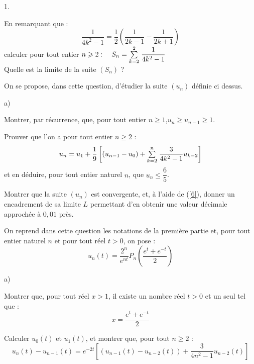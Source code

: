 \documentclass[11pt]{article}%
\begin{document}
\begin{noliste}{1.}
 \setlength{\itemsep}{4mm}
\item En remarquant que :
\[
\dfrac{1}{4k^{2}-1} = \dfrac{1}{2}(\dfrac{1}{2k-1}-\dfrac{1}{2k + 1})
\]
calculer pour tout entier $n\geqslant 2 :\quad S_{n} = {\textstyle\sum\limits_{k =
2}^{2}}\hspace{.1cm}\dfrac{1}{4k^{2}-1}$\\
Quelle est la limite de la suite $(S_{n})$ ?

\item On se propose, dans cette question, d'étudier la suite $(u_{n})$
définie ci dessus.

\begin{noliste}{a)}
 \setlength{\itemsep}{2mm}
\item Montrer, par récurrence, que, pour tout entier $n\geq
1$,\hspace{5mm}$u_{n}\geq u_{n-1}\geq 1$.

\item Prouver que l'on a pour tout entier $n\geq 2$ : 
\begin{equation}
u_{n} = u_{1} + \dfrac{1}{9}\left[ (u_{n-1}-u_{0}) + {\textstyle\sum\limits_{k =
2}^{n}}\hspace{.1cm}\dfrac{3}{4k^{2}-1}u_{k-2}\right] \label{6}
\end{equation}et en déduire, pour tout entier naturel $n$, que
$u_{n}\leq \dfrac{6}{5}
$.

\item Montrer que la suite $(u_{n})$ est convergente, et, à l'aide de
(\ref{6}), donner un encadrement de sa limite $L$ permettant d'en
obtenir une
valeur décimale approchée à $0,01$ près.
\end{noliste}

\item On reprend dans cette question les notations de la première
partie et,
pour tout entier naturel $n$ et pour tout réel $t>0$, on pose : 
\[
u_{n}(t) = \dfrac{2^{n}}{e^{nt}}P_{n}(\dfrac{e^{t} + e^{-t}}{{2}})
\]

\begin{noliste}{a)}
 \setlength{\itemsep}{2mm}
\item Montrer que, pour tout réel $x>1$, il existe un nombre réel $t>0$
et
un seul tel que : 
\[
x = \dfrac{e^{t} + e^{-t}}{2}
\]

\item Calculer $u_{0}(t)$ et $u_{1}(t)$, et montrer que, pour tout
$n\geq 2$ :\begin{equation}
u_{n}(t)-u_{n-1}(t) = e^{-2t}[(u_{n-1}(t)-u_{n-2}(t)) +
\dfrac{3}{4n^{2}-1}u_{n-2}(t)] \label{7}
\end{equation}


\end{noliste}
\end{noliste}
\end{document}
